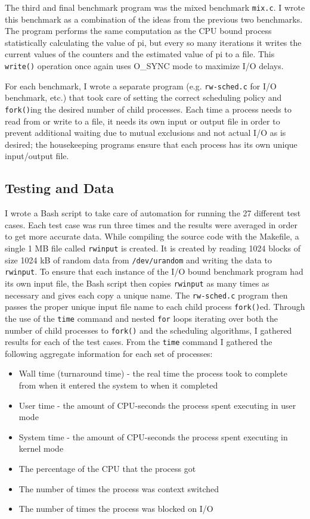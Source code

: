 The third and final benchmark program was the mixed benchmark  \texttt{mix.c}.  I wrote this benchmark as a combination of the ideas from the previous two benchmarks.  The program performs the same computation as the CPU bound process statistically calculating the value of pi, but every so many iterations it writes the current values of the counters and the estimated value of pi to a file.  This \texttt{write()} operation once again uses O\_SYNC mode to maximize I/O delays.

For each benchmark, I wrote a separate program (e.g. \texttt{rw-sched.c} for I/O benchmark, etc.) that took care of setting the correct scheduling policy and \texttt{fork()}ing the desired number of child processes.  Each time a process needs to read from or write to a file, it needs its own input or output file in order to prevent additional waiting due to mutual exclusions and not actual I/O as is desired; the housekeeping programs ensure that each process has its own unique input/output file.

\subsection{Testing and Data}

I wrote a Bash script to take care of automation for running the 27 different test cases.  Each test case was run three times and the results were averaged in order to get more accurate data.  While compiling the source code with the Makefile, a single 1 MB file called \texttt{rwinput} is created.  It is created by reading 1024 blocks of size 1024 kB of random data from \texttt{/dev/urandom} and writing the data to \texttt{rwinput}.  To ensure that each instance of the I/O bound benchmark program had its own input file, the Bash script then copies \texttt{rwinput} as many times as necessary and gives each copy a unique name.  The \texttt{rw-sched.c} program then passes the proper unique input file name to each child process \texttt{fork()}ed.  Through the use of the \texttt{time} command and nested \texttt{for} loops iterating over both the number of child processes to \texttt{fork()} and the scheduling algorithms, I gathered results for each of the test cases.  From the \texttt{time} command I gathered the following aggregate information for each set of processes:
\begin{itemize}
  \item Wall time (turnaround time) - the real time the process took to complete from when it entered the system to when it completed
  \item User time - the amount of CPU-seconds the process spent executing in user mode
  \item System time - the amount of CPU-seconds the process spent executing in kernel mode
  \item The percentage of the CPU that the process got
  \item The number of times the process was context switched
  \item The number of times the process was blocked on I/O
\end{itemize}

